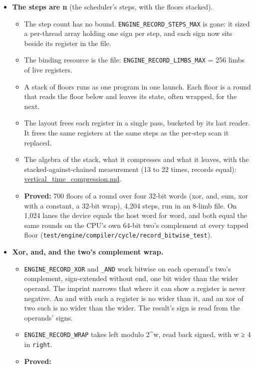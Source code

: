 \begin{itemize}
\item \textbf{The steps are n} (the scheduler's steps, with the floors stacked).

\begin{itemize}
\item The step count has no bound. \texttt{ENGINE\_\allowbreak{}RECORD\_\allowbreak{}STEPS\_\allowbreak{}MAX} is gone: it sized a per-thread array holding one sign per step, and each sign now sits beside its register in the file.
\item The binding resource is the file: \texttt{ENGINE\_\allowbreak{}RECORD\_\allowbreak{}LIMBS\_\allowbreak{}MAX} = 256 limbs of live registers.
\item A stack of floors runs as one program in one launch. Each floor is a round that reads the floor below and leaves its state, often wrapped, for the next.
\item The layout frees each register in a single pass, bucketed by its last reader. It frees the same registers at the same steps as the per-step scan it replaced.
\item The algebra of the stack, what it compresses and what it leaves, with the stacked-against-chained measurement (13 to 22 times, records equal): \hyperref[chap:vertical-time-compression]{vertical\_\allowbreak{}time\_\allowbreak{}compression.md}.
\item \textbf{Proved:} 700 floors of a round over four 32-bit words (xor, and, sum, xor with a constant, a 32-bit wrap), 4,204 steps, run in an 8-limb file. On 1,024 lanes the device equals the host word for word, and both equal the same rounds on the CPU's own 64-bit two's complement at every tapped floor (\texttt{test/\allowbreak{}engine/\allowbreak{}compiler/\allowbreak{}cycle/\allowbreak{}record\_\allowbreak{}bitwise\_\allowbreak{}test}).
\end{itemize}
\item \textbf{Xor, and, and the two's complement wrap.}

\begin{itemize}
\item \texttt{ENGINE\_\allowbreak{}RECORD\_\allowbreak{}XOR} and \texttt{\_\allowbreak{}AND} work bitwise on each operand's two's complement, sign-extended without end, one bit wider than the wider operand. The imprint narrows that where it can show a register is never negative. An and with such a register is no wider than it, and an xor of two such is no wider than the wider. The result's sign is read from the operands' signs.
\item \texttt{ENGINE\_\allowbreak{}RECORD\_\allowbreak{}WRAP} takes left modulo 2\textasciicircum{}w, read back signed, with w ≥ 4 in \texttt{right}.
\item \textbf{Proved:}


\end{itemize}
\end{itemize}
